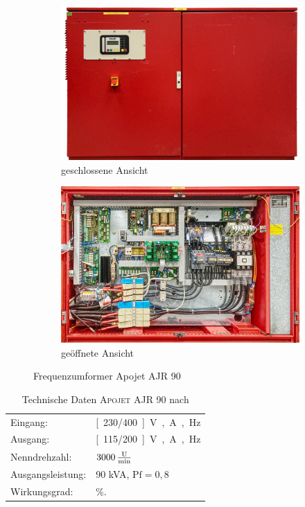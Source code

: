 \begin{figure}
\centering
\begin{subfigure}{.49\textwidth}
	\centering
	\includegraphics[width=\textwidth]{Bilder/Umformer_vorne_geschlossen.pdf}
	\caption{geschlossene Ansicht}
\end{subfigure}
\begin{subfigure}{.49\textwidth}
	\centering
	\includegraphics[width=\textwidth]{Bilder/Umformer_vorne_offen.pdf}
	\caption{geöffnete Ansicht}
\end{subfigure}
\caption{Frequenzumformer Apojet AJR 90}
\label{fig:RenderbildUmformer}
\end{figure}

\begin{table}[b]
\caption{Technische Daten \textsc{Apojet AJR 90} nach \cite{pillerpowersystemsBetriebshandbuchAPOJET202021}}\label{tab:Leistungsdaten}
\centering
\begin{tabular}{@{}ll@{}}
\toprule
Eingang:         & \unit[230/400]{V}, \unit[145]{A}, \unit[50]{Hz}      \\ 
Ausgang:         & \unit[115/200]{V}, \unit[260]{A}, \unit[400]{Hz} \\
Nenndrehzahl:    & $\unit[3000]{\frac{U}{min}}$                     \\
Ausgangsleistung:& 90 kVA, $\mathrm{Pf}=0,8$                        \\
Wirkungsgrad:    & \unit[85]{\%}.                                   \\ \bottomrule
\end{tabular}
\end{table}

